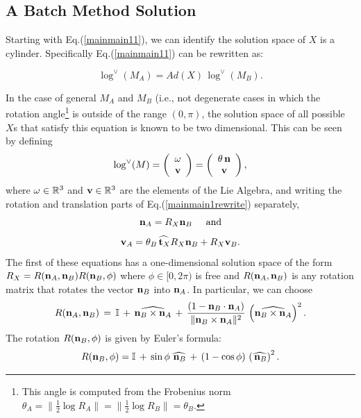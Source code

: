 \documentclass[twocolumn,10pt]{asme2ej}
\newcommand{\II}{\mathbb{I}}
\newcommand{\half}{\frac{1}{2}}
\begin{document}
\subsection{A Batch Method Solution}

Starting with Eq.(\ref{mainmain11}), we can identify the solution space of $X$ is a cylinder. Specifically Eq.(\ref{mainmain11}) can be rewritten as:

\begin{equation}
\log^{\vee}(M_A)  = Ad(X) \,\log^{\vee}(M_B).
\label{mainmain1rewrite} \end{equation}

In the case of general $M_A$ and $M_B$ (i.e., not degenerate cases in which the rotation angle\footnote{This angle is computed from the Frobenius norm $\theta_A =\|\half \log R_A\| = \|\half \log R_B\|= \theta_B$.} is outside of the range
$(0,\pi)$, the solution space of all possible $X$s that satisfy this equation is known to be two dimensional.
This can be seen by defining
$$ \log^{\vee}(M) = \left(\begin{array}{c}
\omega \\
{\bf v} \end{array} \right)
=\left(\begin{array}{c}
\theta \, {\bf n} \\
{\bf v} \end{array} \right), $$
where ${\bf \omega} \in \mathbb{R}^3$ and ${\bf v} \in \mathbb{R}^3$ are the elements of the Lie Algebra, and writing the rotation and translation parts of Eq.(\ref{mainmain1rewrite}) separately,
\begin{equation}
{\bf n}_A = R_X {\bf n}_B \hspace{5mm}\mbox{and}
\label{nanb} \end{equation}
\begin{equation}
{\bf v}_A = \theta_B \widehat{\,{\bf t}_X} R_X {\bf n}_B + R_X {\bf v}_B.
\label{vavb} \end{equation}
The first of these equations has a one-dimensional solution space of the form
$R_X = R({\bf n}_A, {\bf n}_B) R({\bf n}_B, \phi)$ where $\phi \in [0,2\pi)$ is free and
$R({\bf n}_A, {\bf n}_B)$ is any rotation matrix that rotates the vector ${\bf n}_B$ into ${\bf n}_A$.
In particular, we can choose
\begin{equation}
R({\bf n}_A, {\bf n}_B)  \,=\,
\II \,+\, \widehat{{\bf n}_B \times {\bf n}_A}
\,+\, \frac{(1- {\bf n}_B \cdot {\bf n}_A)}{\|{\bf n}_B \times {\bf n}_A\|^2} \, \left(\widehat{{\bf n}_B \times {\bf n}_A}\right)^2.
\label{transab}
\end{equation}
The rotation $R({\bf n}_B, \phi)$ is given by Euler's formula:
$$ R({\bf n}_B, \phi) = \II \,+\, \sin \phi \, \widehat{\,{\bf n}_B} \,+\, (1-\cos \phi)\, \left(\widehat{\,{\bf n}_B}\right)^2. $$
\end{document}
